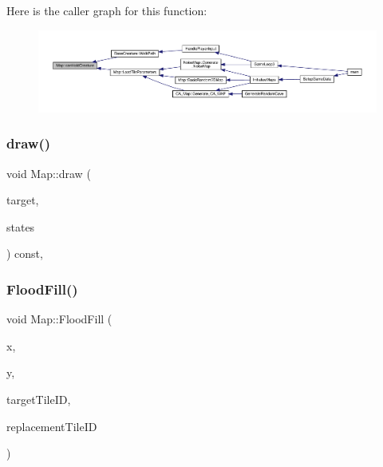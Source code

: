 Here is the caller graph for this function\+:
\nopagebreak
\begin{figure}[H]
\begin{center}
\leavevmode
\includegraphics[width=350pt]{dd/d11/class_map_a2ee6fd8a412c966c941784b226374bd1_icgraph}
\end{center}
\end{figure}
\mbox{\label{class_map_ab78fd8c747e184be9b86b993a60ca00b}} 
\subsubsection{\texorpdfstring{draw()}{draw()}}
{\footnotesize\ttfamily void Map\+::draw (\begin{DoxyParamCaption}\item[{sf\+::\+Render\+Target \&}]{target,  }\item[{sf\+::\+Render\+States}]{states }\end{DoxyParamCaption}) const\hspace{0.3cm}{\ttfamily [private]}, {\ttfamily [virtual]}}

\mbox{\label{class_map_af2d39f9bcdfea3c79c3670f79fc7f548}} 
\subsubsection{\texorpdfstring{Flood\+Fill()}{FloodFill()}\hspace{0.1cm}{\footnotesize\ttfamily [1/2]}}
{\footnotesize\ttfamily void Map\+::\+Flood\+Fill (\begin{DoxyParamCaption}\item[{int}]{x,  }\item[{int}]{y,  }\item[{int}]{target\+Tile\+ID,  }\item[{int}]{replacement\+Tile\+ID }\end{DoxyParamCaption})}

\mbox{\label{class_map_adeb884ce208e7fca98bb7d6c86c4ace6}} 
